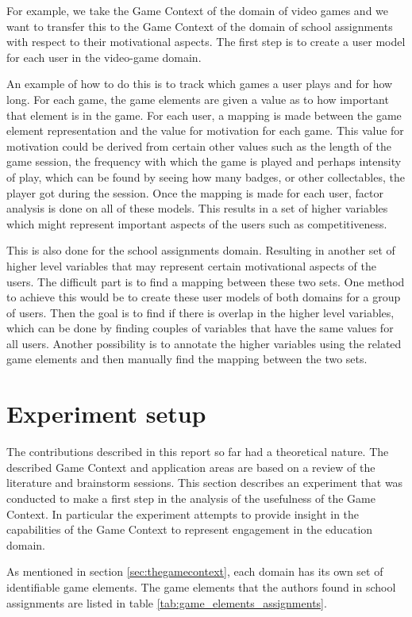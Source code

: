 \documentclass[11pt]{article}
\begin{document}
For example, we take the Game Context of the domain of video games and we want to transfer this to the Game Context of the domain of school assignments with respect to their motivational aspects. The first step is to create a user model for each user in the video-game domain. 

An example of how to do this is to track which games a user plays and for how long. For each game, the game elements are given a value as to how important that element is in the game. For each user, a mapping is made between the game element representation and the value for motivation for each game. This value for motivation could be derived from certain other values such as the length of the game session, the frequency with which the game is played and perhaps intensity of play, which can be found by seeing how many badges, or other collectables, the player got during the session. Once the mapping is made for each user, factor analysis is done on all of these models. This results in a set of higher variables which might represent important aspects of the users such as competitiveness.

This is also done for the school assignments domain. Resulting in another set of higher level variables that may represent certain motivational aspects of the users. The difficult part is to find a mapping between these two sets. One method to achieve this would be to create these user models of both domains for a group of users. Then the goal is to find if there is overlap in the higher level variables, which can be done by finding couples of variables that have the same values for all users. Another possibility is to annotate the higher variables using the related game elements and then manually find the mapping between the two sets.

\section{Experiment setup}\label{sec:experiment}
The contributions described in this report so far had a theoretical nature. The described Game Context and application areas are based on a review of the literature and brainstorm sessions. This section describes an experiment that was conducted to make a first step in the analysis of the usefulness of the Game Context. In particular the experiment attempts to provide insight in the capabilities of the Game Context to represent engagement in the education domain. 

As mentioned in section \ref{sec:thegamecontext}, each domain has its own set of identifiable game elements. The game elements that the authors found in school assignments are listed in table \ref{tab:game_elements_assignments}.
\end{document}
